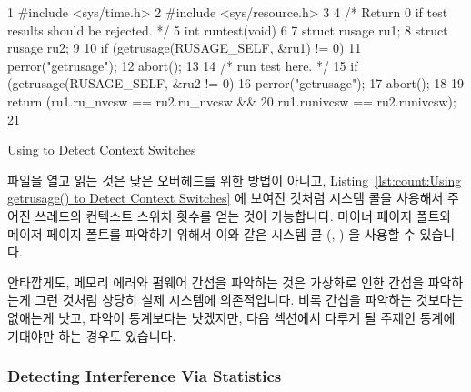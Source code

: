 \begin{listing}[tb]
{ \scriptsize
\begin{verbbox}
  1 #include <sys/time.h>
  2 #include <sys/resource.h>
  3 
  4 /* Return 0 if test results should be rejected. */
  5 int runtest(void)
  6 {
  7   struct rusage ru1;
  8   struct rusage ru2;
  9 
 10   if (getrusage(RUSAGE_SELF, &ru1) != 0) {
 11     perror("getrusage");
 12     abort();
 13   }
 14   /* run test here. */
 15   if (getrusage(RUSAGE_SELF, &ru2 != 0) {
 16     perror("getrusage");
 17     abort();
 18   }
 19   return (ru1.ru_nvcsw == ru2.ru_nvcsw &&
 20     ru1.runivcsw == ru2.runivcsw);
 21 }
\end{verbbox}
}
\centering
\theverbbox
\caption{Using  to Detect Context Switches}
\label{lst:count:Using getrusage() to Detect Context Switches}
\end{listing}

파일을 열고 읽는 것은 낮은 오버헤드를 위한 방법이 아니고,
Listing~\ref{lst:count:Using getrusage() to Detect Context Switches} 에 보여진
것처럼  시스템 콜을 사용해서 주어진 쓰레드의 컨텍스트 스위치
횟수를 얻는 것이 가능합니다.
마이너 페이지 폴트와 메이저 페이지 폴트를 파악하기 위해서 이와 같은 시스템 콜
(, ) 을 사용할 수 있습니다.

안타깝게도, 메모리 에러와 펌웨어 간섭을 파악하는 것은 가상화로 인한 간섭을
파악하는게 그런 것처럼 상당히 실제 시스템에 의존적입니다.
비록 간섭을 파악하는 것보다는 없애는게 낫고, 파악이 통계보다는 낫겠지만, 다음
섹션에서 다루게 될 주제인 통계에 기대야만 하는 경우도 있습니다.

\subsubsection{Detecting Interference Via Statistics}
\label{sec:debugging:Detecting Interference Via Statistics}

